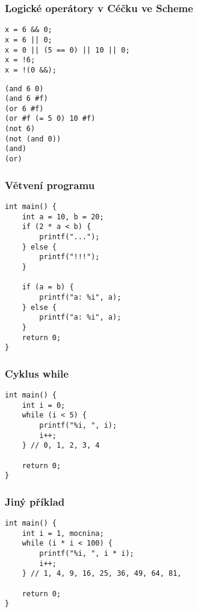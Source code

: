 \documentclass{beamer}
\newenvironment{itemizex}%
  {\large \begin{itemize}%
    \setlength{\itemsep}{8pt}%
    \setlength{\parskip}{8pt}}%
  {\end{itemize}}
\begin{document}



\begin{frame}[t,fragile]\frametitle{Logické operátory v Céčku ve Scheme} 
\begin{verbatim} 
x = 6 && 0;
x = 6 || 0;
x = 0 || (5 == 0) || 10 || 0;
x = !6;
x = !(0 &&);
\end{verbatim}

\begin{verbatim} 
(and 6 0)
(and 6 #f)
(or 6 #f)
(or #f (= 5 0) 10 #f)
(not 6)
(not (and 0))
(and)
(or)
\end{verbatim}
\end{frame}


\begin{frame}[t,fragile]\frametitle{Větvení programu} 
\begin{verbatim} 
int main() {
    int a = 10, b = 20;
    if (2 * a < b) {
        printf("...");
    } else {
        printf("!!!");
    }

    if (a = b) {
        printf("a: %i", a); 
    } else {
        printf("a: %i", a); 
    }
    return 0;
}
\end{verbatim}
\end{frame}


\begin{frame}[t,fragile]\frametitle{Cyklus while} 
\begin{verbatim} 
int main() {
    int i = 0;
    while (i < 5) {
        printf("%i, ", i);
        i++;
    } // 0, 1, 2, 3, 4

    return 0;
}
\end{verbatim}
\end{frame}


\begin{frame}[t,fragile]\frametitle{Jiný příklad} 
\begin{verbatim} 
int main() {
    int i = 1, mocnina;
    while (i * i < 100) {
        printf("%i, ", i * i);
        i++;
    } // 1, 4, 9, 16, 25, 36, 49, 64, 81,

    return 0;
}
\end{verbatim}
\end{frame}
\end{document}
